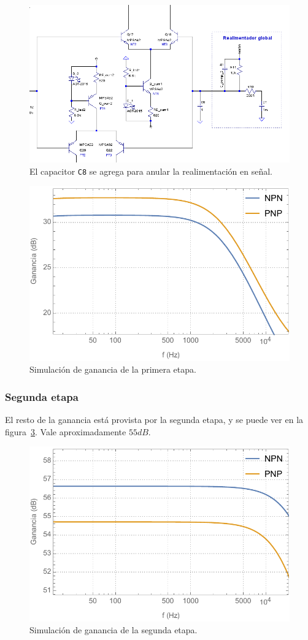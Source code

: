 \documentclass[a4paper,12pt,twoside]{article}
\begin{document}
\begin{figure}[H]
	\centering
	\includegraphics[height=0.4\textwidth]{img/sim/ala}
	\caption{El capacitor \texttt{C8} se agrega para anular la realimentación en señal.}
	\label{fig:ala}
\end{figure}


\begin{figure}[H]
	\centering
	\includegraphics[height=0.4\textwidth]{img/sim/1era-etapa-bode}
	\caption{Simulación de ganancia de la primera etapa.}
	\label{fig:1era-etapa-bode}
\end{figure}

\subsubsection{Segunda etapa}

El resto de la ganancia está provista por la segunda etapa, y se puede ver en la figura~\ref{fig:2da-etapa-bode}. Vale aproximadamente $55dB$.

\begin{figure}[H]
	\centering
	\includegraphics[height=0.4\textwidth]{img/sim/2da-etapa-bode}
	\caption{Simulación de ganancia de la segunda etapa.}
	\label{fig:2da-etapa-bode}
\end{figure}
\end{document}
